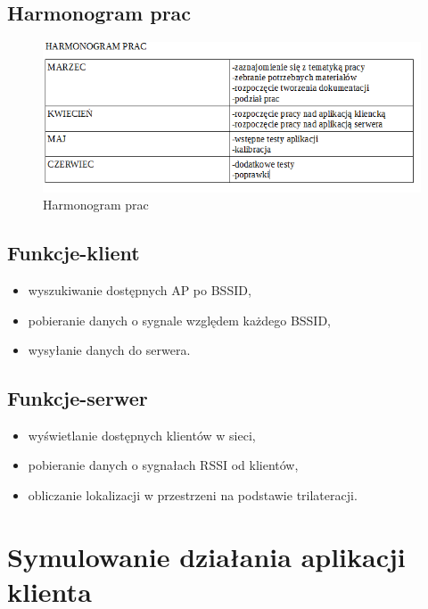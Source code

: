 \documentclass{article}
\begin{document}
\subsection{Harmonogram prac}
\begin{figure}[H]
	\centering
	\includegraphics[width=15cm]{harmonogram.png}
	\caption{Harmonogram prac}
	\label{fig:rysowanie.png}
\end{figure}



\subsection{Funkcje-klient}


\begin{itemize}
\item wyszukiwanie dostępnych AP po BSSID,
\item pobieranie danych o sygnale względem każdego BSSID,
\item wysyłanie danych do serwera.
\end{itemize}

\subsection{Funkcje-serwer}


\begin{itemize}
	\item wyświetlanie dostępnych klientów w sieci,
	\item pobieranie danych o sygnałach RSSI od klientów,
	\item obliczanie lokalizacji w przestrzeni na podstawie trilateracji.
\end{itemize}
\newpage

\section{Symulowanie działania aplikacji klienta}
\end{document}
